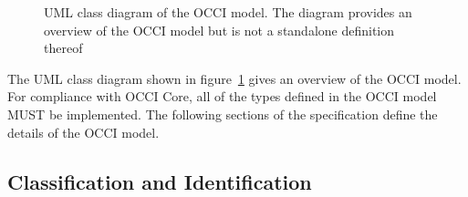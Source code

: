 \documentclass[10pt,a4paper,british]{article}
\begin{document}
\begin{figure}[!h]
{\centering {} \par}
\caption{UML class diagram of the OCCI model. The diagram provides an
overview of the OCCI model but is not a standalone definition thereof}
\label{fig:occi_model}
\end{figure}

The UML class diagram shown in figure~\ref{fig:occi_model} gives an overview of
the OCCI model.  For compliance with OCCI Core, all of the types defined in
the OCCI model MUST be implemented.
The following sections of the specification define the details of the OCCI
model.

\subsection{Classification and Identification}
\end{document}
